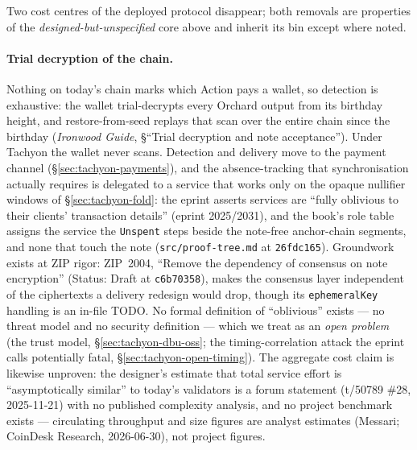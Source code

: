\documentclass[11pt,a4paper]{article}
\theoremstyle{definition}
\begin{document}
Two cost centres of the deployed protocol disappear; both removals are
properties of the \emph{designed-but-unspecified} core above and inherit its
bin except where noted.

\paragraph{Trial decryption of the chain.} Nothing on today's chain marks
which Action pays a wallet, so detection is exhaustive: the wallet
trial-decrypts every Orchard output from its birthday height, and
restore-from-seed replays that scan over the entire chain since the birthday
(\emph{Ironwood Guide}, \S``Trial decryption and note acceptance''). Under
Tachyon the wallet never
scans. Detection and delivery move to the payment channel
(\S\ref{sec:tachyon-payments}), and the absence-tracking that
synchronisation actually requires is delegated to a service that works only
on the opaque nullifier windows of \S\ref{sec:tachyon-fold}: the eprint
asserts services are ``fully oblivious to their clients' transaction
details'' (eprint 2025/2031), and the book's role table assigns the service
the \texttt{Unspent} steps beside the note-free anchor-chain segments, and
none that touch the note (\texttt{src/proof-tree.md} at \texttt{26fdc165}).
Groundwork exists at ZIP
rigor: ZIP~2004, ``Remove the dependency of consensus on note encryption''
(Status: Draft at \texttt{c6b70358}), makes the consensus layer independent
of the ciphertexts a delivery redesign would drop, though its
\texttt{ephemeralKey} handling is an in-file TODO. No formal definition of
``oblivious'' exists --- no threat model and no security definition --- which
we treat as an \emph{open problem} (the trust model,
\S\ref{sec:tachyon-dbu-oss}; the timing-correlation attack the eprint calls
potentially fatal, \S\ref{sec:tachyon-open-timing}).
The aggregate cost claim is likewise unproven: the designer's estimate that
total service effort is ``asymptotically similar'' to today's validators is
a forum statement (t/50789 \#28, 2025-11-21) with no published complexity
analysis, and no project benchmark exists --- circulating throughput and
size figures are analyst estimates (Messari; CoinDesk Research, 2026-06-30),
not project figures.
\end{document}
